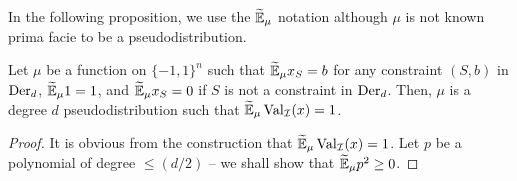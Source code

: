 	In the following proposition, we use the $\widetilde{\mathbb{E}}_\mu$ notation although $\mu$ is not known prima facie to be a pseudodistribution.
	\begin{fprop}
		Let $\mu$ be a function on $\{-1,1\}^n$ such that $\widetilde{\mathbb{E}}_\mu x_S = b$ for any constraint $(S,b)$ in $\operatorname{Der}_d$, $\widetilde{\mathbb{E}}_\mu 1 = 1$, and $\widetilde{\mathbb{E}}_\mu x_S = 0$ if $S$ is not a constraint in $\operatorname{Der}_d$. Then, $\mu$ is a degree $d$ pseudodistribution such that $\widetilde{\mathbb{E}}_\mu \operatorname{Val}_\mathcal{I}(x) = 1$.
	\end{fprop}
	\begin{proof}
		It is obvious from the construction that $\widetilde{\mathbb{E}}_\mu \operatorname{Val}_\mathcal{I}(x) = 1$. Let $p$ be a polynomial of degree $\le (d/2)$ -- we shall show that $\widetilde{\mathbb{E}}_\mu p^2 \ge 0$.
	\end{proof}